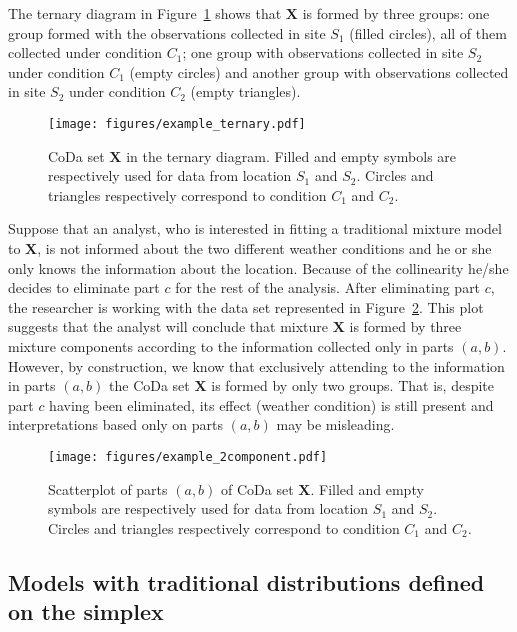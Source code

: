 \documentclass[12pt, a4paper]{article}
\theoremstyle{definition}
\begin{document}
The ternary diagram in Figure~\ref{example_elim_component} shows that $\mathbf{X}$ is formed by three groups: one group formed with the observations collected in site $S_1$ (filled circles), all of them collected under condition $C_1$; one group with observations collected in site $S_2$ under condition $C_1$ (empty circles) and another group with observations collected in site $S_2$ under condition $C_2$ (empty triangles).
\begin{figure}[thbp]
\centering
\texttt{[image: figures/example\_ternary.pdf]}
\caption{CoDa set $\mathbf{X}$ in the ternary diagram. Filled and empty symbols are respectively used for
data from location $S_1$ and $S_2$. Circles and triangles respectively correspond to condition
$C_1$ and $C_2$. }\label{example_elim_component}
\end{figure}
Suppose that an analyst, who is interested in fitting a traditional mixture model to $\mathbf{X}$, is not informed about the two different weather conditions and he or she only knows the information about the location. Because of
the collinearity he/she decides to eliminate part $c$ for the rest of the analysis. After eliminating part $c$, the researcher is working with the data set represented in Figure~\ref{example_elim_2_components}. This plot suggests that the analyst will conclude that mixture $\mathbf{X}$ is formed by three mixture components according to the information collected only in parts $(a, b)$. However, by construction, we know that exclusively attending to the information in parts $(a, b)$ the CoDa set $\mathbf{X}$ is formed by only two groups. That is, despite part $c$ having been eliminated, its effect (weather condition) is still present and interpretations based only on parts $(a, b)$ may be misleading.
\begin{figure}[thbp]
\centering
\texttt{[image: figures/example\_2component.pdf]}
\caption{Scatterplot of parts $(a,b)$ of CoDa set $\mathbf{X}$. Filled and empty symbols are respectively used for
data from location $S_1$ and $S_2$. Circles and triangles respectively correspond to condition
$C_1$ and $C_2$.}\label{example_elim_2_components}
\end{figure}

\subsection{Models with traditional distributions defined on the simplex}
\label{simplex_section}
\end{document}

